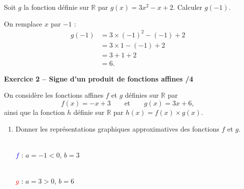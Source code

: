 \documentclass[10pt,a4paper]{article}
\begin{document}
\begin{sujets}
Soit \(g\) la fonction définie sur \(\mathbb{R}\) par \(g(x)=3x^2-x+2\). Calculer \(g(-1)\).

On remplace \(x\) par \(-1\) :
\[
\begin{aligned}
g(-1) &= 3\times(-1)^2-(-1)+2\\
      &= 3\times1-(-1)+2\\
      &= 3+1+2\\
      &= 6.
\end{aligned}
\]

\textbf{Exercice 2 -- Signe d'un produit de fonctions affines \hfill /4}

On considère les fonctions affines \(f\) et \(g\) définies sur \(\mathbb{R}\) par
\[
f(x)=-x+3 \qquad\text{et}\qquad g(x)=3x+6,
\]
ainsi que la fonction \(h\) définie sur \(\mathbb{R}\) par \(h(x)=f(x)\times g(x)\).

\begin{enumerate}
\item Donner les représentations graphiques approximatives des fonctions \(f\) et \(g\).

\begin{center}
\begin{minipage}{2.6cm}
\centering
{}\\[2pt]
{\scriptsize \textcolor{blue}{\(f\)} : \(a=-1<0\), \(b=3\)}
\end{minipage}
\hspace{0.3cm}
\begin{minipage}{2.6cm}
\centering
{}\\[2pt]
{\scriptsize \textcolor{red}{\(g\)} : \(a=3>0\), \(b=6\)}
\end{minipage}
\end{center}


\end{enumerate}
\end{sujets}
\end{document}
